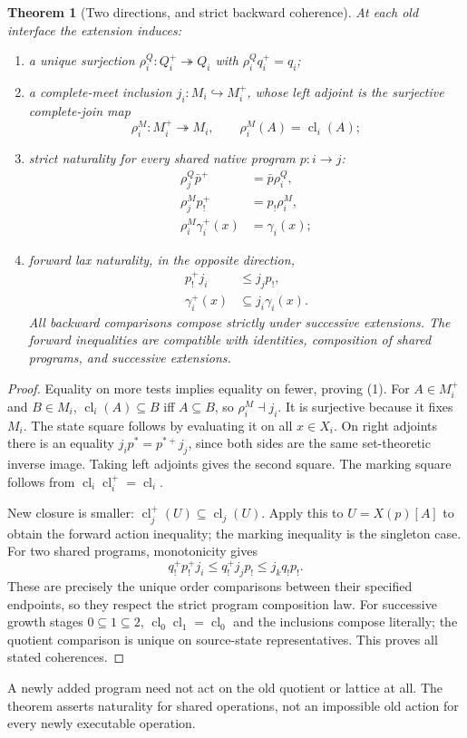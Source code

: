 \documentclass[11pt]{article}
\newtheorem{theorem}{Theorem}[section]
\theoremstyle{definition}\newtheorem{definition}[theorem]{Definition}
\theoremstyle{remark}\newtheorem{remark}[theorem]{Remark}
\newcommand{\cl}{\operatorname{cl}}
\begin{document}
\begin{theorem}[Two directions, and strict backward coherence]
At each old interface the extension induces:
\begin{enumerate}
\item a unique surjection $\rho_i^Q:Q_i^+\twoheadrightarrow Q_i$
with $\rho_i^Qq_i^+=q_i$;
\item a complete-meet inclusion $j_i:M_i\hookrightarrow M_i^+$,
whose left adjoint is the surjective complete-join map
\[
 \rho_i^M:M_i^+\twoheadrightarrow M_i,
 \qquad \rho_i^M(A)=\cl_i(A);
\]
\item strict naturality for every \emph{shared} native program $p:i\to j$:
\begin{align*}
 \rho_j^Q\bar p^+&=\bar p\rho_i^Q,\\
 \rho_j^M p_!^+&=p_!\rho_i^M,\\
 \rho_i^M\gamma_i^+(x)&=\gamma_i(x);
\end{align*}
\item forward lax naturality, in the opposite direction,
\begin{align*}
 p_!^+j_i&\leq j_jp_!,\\
 \gamma_i^+(x)&\subseteq j_i\gamma_i(x).
\end{align*}
All backward comparisons compose strictly under successive extensions.
The forward inequalities are compatible with identities, composition
of shared programs, and successive extensions.
\end{enumerate}
\end{theorem}
\begin{proof}
Equality on more tests implies equality on fewer, proving (1).
For $A\in M_i^+$ and $B\in M_i$,
$\cl_i(A)\subseteq B$ iff $A\subseteq B$, so
$\rho_i^M\dashv j_i$. It is surjective because it fixes $M_i$.
The state square follows by evaluating it on all $x\in X_i$.
On right adjoints there is an equality
$j_i p^*=p^{*+}j_j$, since both sides are the same set-theoretic
inverse image. Taking left adjoints gives the second square. The
marking square follows from
$\cl_i\cl_i^+=\cl_i$.

New closure is smaller: $\cl_j^+(U)\subseteq\cl_j(U)$.
Apply this to $U=X(p)[A]$ to obtain the forward action inequality;
the marking inequality is the singleton case. For two shared programs,
monotonicity gives
\[
 q_!^+p_!^+j_i\leq q_!^+j_jp_!
                  \leq j_kq_!p_!.
\]
These are precisely the unique order comparisons between their
specified endpoints, so they respect the strict program composition
law. For successive growth stages $0\subseteq1\subseteq2$,
$\cl_0\cl_1=\cl_0$ and the inclusions compose literally;
the quotient comparison is unique on source-state representatives.
This proves all stated coherences.
\end{proof}
A newly added program need not act on the old quotient or lattice at all.
The theorem asserts naturality for shared operations, not an impossible
old action for every newly executable operation.
\end{document}
